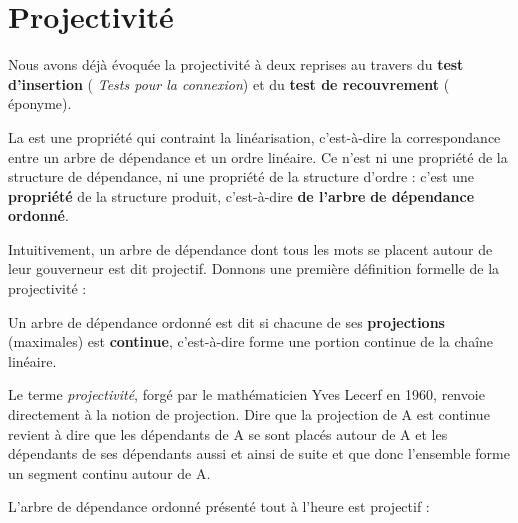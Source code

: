 \section{Projectivité}\label{sec:3.5.14}

Nous avons déjà évoquée la projectivité à deux reprises au travers du \textbf{test d’insertion} ( \textit{Tests pour la connexion}) et du \textbf{test de recouvrement} ( éponyme).

La  est une propriété qui contraint la linéarisation, c’est-à-dire la correspondance entre un arbre de dépendance et un ordre linéaire. Ce n’est ni une propriété de la structure de dépendance, ni une propriété de la structure d’ordre : c’est une \textbf{propriété} de la structure produit, c’est-à-dire \textbf{de l’arbre} \textbf{de dépendance ordonné}.

Intuitivement, un arbre de dépendance dont tous les mots se placent autour de leur gouverneur est dit projectif. Donnons une première définition formelle de la projectivité :

{Un arbre de dépendance ordonné est dit  si chacune de ses \textbf{projections} (maximales) est \textbf{continue}, c’est-à-dire forme une portion continue de la chaîne linéaire.}

Le terme \textit{projectivité}, forgé par le mathématicien Yves Lecerf en 1960, renvoie directement à la notion de projection. Dire que la projection de A est continue revient à dire que les dépendants de A se sont placés autour de A et les dépendants de ses dépendants aussi et ainsi de suite et que donc l’ensemble forme un segment continu autour de A.

L’arbre de dépendance ordonné présenté tout à l’heure est projectif :


